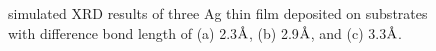 \begingroup
\begin{figure}[!ht]
  \centering

  \label{Chap:Ag/ZnO:fig:10d}
  \label{Chap:Ag/ZnO:fig:10e}
  \label{Chap:Ag/ZnO:fig:10f}

\caption[Simulated \ac{XRD} results of Ag thin film morphology on square substrates.]{simulated \ac{XRD} results of three Ag thin film deposited on substrates with difference bond length of (a) 2.3$\mbox{\normalfont\AA}$, (b) 2.9$\mbox{\normalfont\AA}$, and (c) 3.3$\mbox{\normalfont\AA}$.}
  \label{Chap:Ag/ZnO:fig10-2}
\end{figure}
\endgroup


